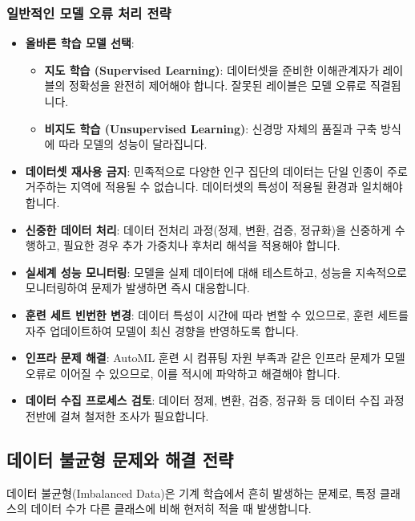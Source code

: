 \documentclass[11pt,a4paper]{article}
\begin{document}
\begin{itemize}
\begin{itemize}
    \subsubsection*{일반적인 모델 오류 처리 전략}

    \begin{itemize}
        \item \textbf{올바른 학습 모델 선택}:
        \begin{itemize}
            \item \textbf{지도 학습 (Supervised Learning)}: 데이터셋을 준비한 이해관계자가 레이블의 정확성을 완전히 제어해야 합니다. 잘못된 레이블은 모델 오류로 직결됩니다.
            \item \textbf{비지도 학습 (Unsupervised Learning)}: 신경망 자체의 품질과 구축 방식에 따라 모델의 성능이 달라집니다.
        \end{itemize}
        \item \textbf{데이터셋 재사용 금지}: 민족적으로 다양한 인구 집단의 데이터는 단일 인종이 주로 거주하는 지역에 적용될 수 없습니다. 데이터셋의 특성이 적용될 환경과 일치해야 합니다.
        \item \textbf{신중한 데이터 처리}: 데이터 전처리 과정(정제, 변환, 검증, 정규화)을 신중하게 수행하고, 필요한 경우 추가 가중치나 후처리 해석을 적용해야 합니다.
        \item \textbf{실세계 성능 모니터링}: 모델을 실제 데이터에 대해 테스트하고, 성능을 지속적으로 모니터링하여 문제가 발생하면 즉시 대응합니다.
        \item \textbf{훈련 세트 빈번한 변경}: 데이터 특성이 시간에 따라 변할 수 있으므로, 훈련 세트를 자주 업데이트하여 모델이 최신 경향을 반영하도록 합니다.
        \item \textbf{인프라 문제 해결}: AutoML 훈련 시 컴퓨팅 자원 부족과 같은 인프라 문제가 모델 오류로 이어질 수 있으므로, 이를 적시에 파악하고 해결해야 합니다.
        \item \textbf{데이터 수집 프로세스 검토}: 데이터 정제, 변환, 검증, 정규화 등 데이터 수집 과정 전반에 걸쳐 철저한 조사가 필요합니다.
    \end{itemize}

\newpage
\subsection*{데이터 불균형 문제와 해결 전략}

데이터 불균형(Imbalanced Data)은 기계 학습에서 흔히 발생하는 문제로, 특정 클래스의 데이터 수가 다른 클래스에 비해 현저히 적을 때 발생합니다.


\end{itemize}
\end{itemize}
\end{document}
